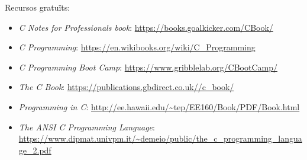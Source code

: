 \documentclass[
]{book}
\providecommand{\tightlist}{%
  \setlength{\itemsep}{0pt}\setlength{\parskip}{0pt}}
\begin{document}
Recursos gratuïts:

\begin{itemize}
\tightlist
\item
  \emph{C Notes for Professionals book}: \url{https://books.goalkicker.com/CBook/}
\item
  \emph{C Programming}: \url{https://en.wikibooks.org/wiki/C_Programming}
\item
  \emph{C Programming Boot Camp}: \url{https://www.gribblelab.org/CBootCamp/}
\item
  \emph{The C Book}: \url{https://publications.gbdirect.co.uk//c_book/}
\item
  \emph{Programming in C}: \url{http://ee.hawaii.edu/~tep/EE160/Book/PDF/Book.html}
\item
  \emph{The ANSI C Programming Language}: \url{https://www.dipmat.univpm.it/~demeio/public/the_c_programming_language_2.pdf}
\end{itemize}

\backmatter
  
\end{document}
